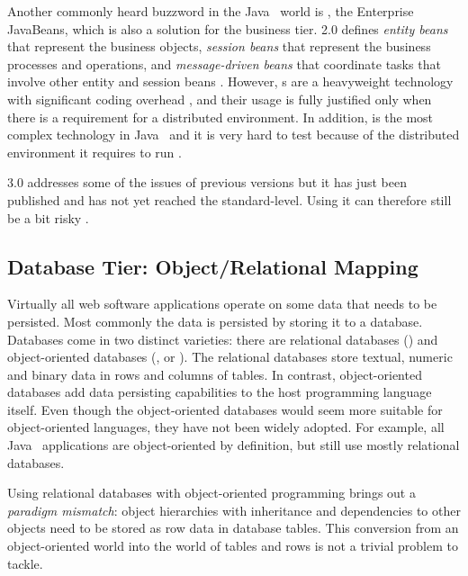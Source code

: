 Another commonly heard buzzword in the Java~ world is 
, the Enterprise JavaBeans, which is also a solution for 
the business tier.  2.0 defines \textsl{entity beans} that 
represent the business objects, \textsl{session beans} that represent 
the business processes and operations, and \textsl{message-driven 
beans} that coordinate tasks that involve other entity and session 
beans \citep{ejb}. However, s are a heavyweight technology 
with significant coding overhead \citep{usingj2ee}, and their usage is 
fully justified only when there is a requirement for a distributed 
environment. In addition,  is the most complex technology 
in Java~ and it is very hard to test because of the 
distributed environment it requires to run \citep{j2eednd}.

 3.0 addresses some of the issues of previous 
versions but it has just been published and has not yet reached the 
standard-level. Using it can therefore still be a bit risky 
\citep{modeltransejb}.



\subsection{Database Tier: Object/Relational Mapping}
\label{toc:webdevel:threetier:db}

Virtually all web software applications operate on some data that 
needs to be persisted. Most commonly the data is persisted by storing 
it to a database. Databases come in two distinct varieties: there are 
relational databases () and object-oriented databases 
(, or ). The relational databases store 
textual, numeric and binary data in rows and columns of tables. In 
contrast, object-oriented databases add data persisting capabilities 
to the host programming language itself. Even though the 
object-oriented databases would seem more suitable for object-oriented 
languages, they have not been widely adopted. For example, all 
Java~ applications are object-oriented by definition, but 
still use mostly relational databases. \citep{j2eednd,hibernateaction}

Using relational databases with object-oriented programming brings out 
a \textsl{paradigm mismatch}: object hierarchies with inheritance and 
dependencies to other objects need to be stored as row data in 
database tables. This conversion from an object-oriented world into 
the world of tables and rows is not a trivial problem to tackle. 
\citep{hibernateaction}

